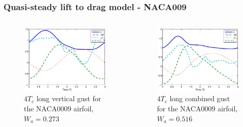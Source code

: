 \documentclass[compress]{beamer}
\begin{document}
\begin{frame}
  \frametitle{Quasi-steady lift to drag model - NACA009}
  \begin{columns}
    \begin{figure}
      \begin{center}
	\includegraphics[width=1\textwidth]{./Figures/Windtype=1_Tg=4_Wg=0p273_LUTNACA0009_alphamax=5_dalphadt=50.eps}
      \end{center}
      \caption{$4T_c$ long vertical gust for the NACA0009 airfoil, $W_a=0.273$}
    \end{figure}
    \begin{figure}[h]
      \begin{center}
	\includegraphics[width=1\textwidth]{./Figures/Windtype=3_Tg=4_Wg=0p516_LUTNACA0009_alphamax=12_dalphadt=50.eps}
      \end{center}
      \caption{$4T_c$ long combined gust for the NACA0009 airfoil, $W_a=0.516$}
    \end{figure}
  \end{columns} %
\end{frame}
\end{document}
